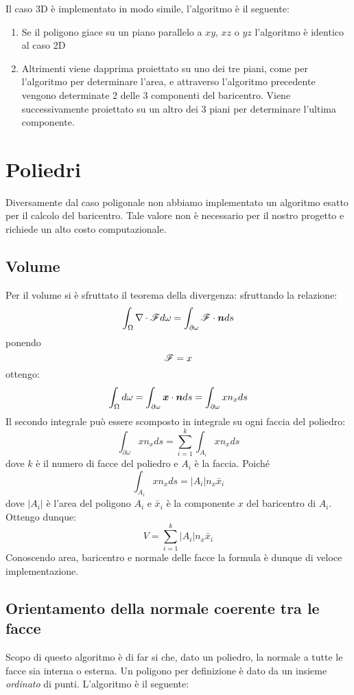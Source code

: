 \documentclass[oneside,12pt]{book}  %
\theoremstyle{plain}
\theoremstyle{definition}
\theoremstyle{remark}
\numberwithin{equation}{chapter} %
\begin{document}
Il caso 3D \`e implementato in modo simile, l'algoritmo \`e il
seguente:

\begin{enumerate}
\item Se il poligono giace su un piano parallelo a $xy$, $xz$ o
  $yz$ l'algoritmo \`e identico al caso 2D

\item Altrimenti viene dapprima proiettato su uno dei tre piani, come
  per l'algoritmo per determinare l'area, e
  attraverso l'algoritmo precedente vengono determinate 2 delle 3
  componenti del baricentro. Viene successivamente proiettato su un
  altro dei 3 piani per determinare l'ultima componente.

\end{enumerate}


\section{Poliedri}
Diversamente dal caso poligonale non abbiamo implementato un algoritmo
esatto per il calcolo del baricentro. Tale valore non \`e necessario
per il nostro progetto e richiede un alto costo computazionale.

\subsection{Volume}
Per il volume si \`e sfruttato il teorema della divergenza: sfruttando
la relazione:
$$ \int_\Omega \nabla \cdot \mathscr{F} d\omega=\int_{\partial\omega}\mathscr{F} \cdot
{\mbox{\boldmath$n$}} ds $$
ponendo $$\mathscr{F}=x$$ ottengo:
$$ \int_\Omega d\omega=\int_{\partial\omega} {\mbox{\boldmath$x$}} \cdot {\mbox{\boldmath$n$}} ds =\int_{\partial\omega} x  n_x ds $$
Il secondo integrale pu\`o essere scomposto in integrale su ogni
faccia del poliedro:
$$ \int_{\partial\omega} x n_x ds=\sum_{i=1}^k \int_{A_i} x n_x ds$$
dove $k$ \`e il numero di facce del poliedro e $A_i$ \`e la faccia.
Poich\'e 
$$\int_{A_i} x n_x ds= |A_i| n_x  \bar x_i $$
dove $|A_i|$ \`e l'area del poligono $A_i$ e $\bar x_i$ \`e la
componente $x$ del baricentro di $A_i$.
Ottengo dunque:
$$ V= \sum_{i=1}^k |A_i|  n_x \bar x_i $$
Conoscendo area, baricentro e normale delle facce la formula \`e dunque di
veloce implementazione.
 
\subsection{Orientamento della normale coerente tra le facce}
Scopo di questo algoritmo \`e di far si che, dato un poliedro, la
normale a tutte le facce sia interna o esterna. Un poligono per
definizione \`e dato da un insieme \textit{ordinato} di
punti. L'algoritmo \`e il seguente:
\end{document}
